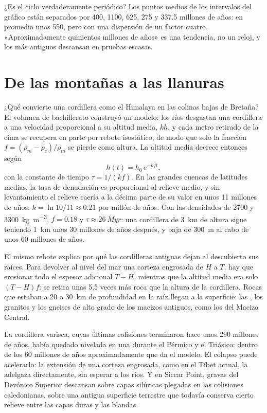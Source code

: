 ¿Es el ciclo verdaderamente periódico? Los puntos medios de los intervalos del gráfico están separados por 400,
1100, 625, 275 y 337.5 millones de años: en promedio unos 550, pero con una dispersión de un factor
cuatro. «Aproximadamente quinientos millones de años» es una tendencia, no un reloj, y los  más
antiguos descansan en pruebas escasas.

\section{De las montañas a las llanuras}\label{sec:b2:wilson-cycle:erosion}

¿Qué convierte una cordillera como el Himalaya en las colinas bajas de Bretaña? El volumen de bachillerato
construyó un modelo: los ríos desgastan una cordillera a una velocidad proporcional a su altitud media, $kh$,
y cada metro retirado de la cima se recupera en parte por rebote isostático, de modo que solo
la fracción $f = (\rho_m - \rho_c)/\rho_m$ se pierde como altura. La altitud media
decrece entonces según
\[
  h(t) = h_0\,e^{-k f t} ,
\]
con la constante de tiempo $\tau = 1/(kf)$. En las grandes cuencas de latitudes medias, la tasa de denudación es
proporcional al relieve medio, y sin levantamiento el relieve caería a la décima parte de su
valor en unos 11 millones de años: $k = \ln 10/11 \approx 0.21$ por millón de años. Con las
densidades de 2700 y \qty{3300}{kg.m^{-3}}, $f = 0.18$ y $\tau \approx \qty{26}{Myr}$: una
cordillera de \qty{3}{km} de altura sigue teniendo \qty{1}{km} unos 30 millones de años después, y baja
de \qty{300}{m} al cabo de unos 60 millones de años.

El mismo rebote explica por qué las cordilleras antiguas dejan al descubierto sus raíces. Para devolver al nivel del mar una corteza engrosada de
$H$ a $T$, hay que erosionar todo el espesor adicional $T - H$, mientras que la altitud media
era solo $(T - H)f$: se retira unas 5.5 veces más roca que la altura de la
cordillera. Rocas que estaban a 20 o \qty{30}{km} de profundidad en la raíz llegan a la superficie: las
, los granitos y los gneises de alto grado de los macizos antiguos, como los del Macizo
Central.

La cordillera varisca, cuyas últimas colisiones terminaron hace unos 290 millones de años, había quedado
nivelada en una  durante el Pérmico y el Triásico: dentro de los 60 millones de años aproximadamente
que da el modelo. El colapso puede acelerarlo: la extensión de una corteza engrosada, como en el
Tíbet actual, la adelgaza directamente, sin esperar a los ríos. Y en Siccar Point, gravas del Devónico Superior descansan sobre
capas silúricas plegadas en las colisiones caledonianas, sobre una antigua superficie terrestre que todavía conserva
cierto relieve entre las capas duras y las blandas.

